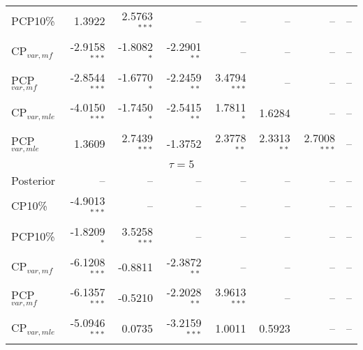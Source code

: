 {{\begin{table}
\begin{tabular}{l | rrrrrrr}
PCP10\% & 1.3922\phantom{$^{***}$} & 2.5763$^{***}$ &    --\phantom{$^{***}$} &    --\phantom{$^{***}$} &    --\phantom{$^{***}$} &    --\phantom{$^{***}$} &    --\phantom{$^{***}$}   \\ 
CP$_{var,mf}$ & -2.9158$^{***}$ & -1.8082$^{*}$\phantom{$^{**}$} & -2.2901$^{**}$\phantom{$^{*}$} &    --\phantom{$^{***}$} &    --\phantom{$^{***}$} &    --\phantom{$^{***}$} &    --\phantom{$^{***}$}   \\ 
PCP$_{var,mf}$ & -2.8544$^{***}$ & -1.6770$^{*}$\phantom{$^{**}$} & -2.2459$^{**}$\phantom{$^{*}$} & 3.4794$^{***}$ &    --\phantom{$^{***}$} &    --\phantom{$^{***}$} &    --\phantom{$^{***}$}   \\ 
CP$_{var,mle}$ & -4.0150$^{***}$ & -1.7450$^{*}$\phantom{$^{**}$} & -2.5415$^{**}$\phantom{$^{*}$} & 1.7811$^{*}$\phantom{$^{**}$} & 1.6284\phantom{$^{***}$} &    --\phantom{$^{***}$} &    --\phantom{$^{***}$}   \\ 
PCP$_{var,mle}$ & 1.3609\phantom{$^{***}$} & 2.7439$^{***}$ & -1.3752\phantom{$^{***}$} & 2.3778$^{**}$\phantom{$^{*}$} & 2.3313$^{**}$\phantom{$^{*}$} & 2.7008$^{***}$ &    --\phantom{$^{***}$}   \\ 
\hline 
%
%
\multicolumn{8}{c}{$\tau = 5$} \\ \hline 
Posterior &    --\phantom{$^{***}$} &    --\phantom{$^{***}$} &    --\phantom{$^{***}$} &    --\phantom{$^{***}$} &    --\phantom{$^{***}$} &    --\phantom{$^{***}$} &    --\phantom{$^{***}$}   \\ 
CP10\% & -4.9013$^{***}$ &    --\phantom{$^{***}$} &    --\phantom{$^{***}$} &    --\phantom{$^{***}$} &    --\phantom{$^{***}$} &    --\phantom{$^{***}$} &    --\phantom{$^{***}$}   \\ 
PCP10\% & -1.8209$^{*}$\phantom{$^{**}$} & 3.5258$^{***}$ &    --\phantom{$^{***}$} &    --\phantom{$^{***}$} &    --\phantom{$^{***}$} &    --\phantom{$^{***}$} &    --\phantom{$^{***}$}   \\ 
CP$_{var,mf}$ & -6.1208$^{***}$ & -0.8811\phantom{$^{***}$} & -2.3872$^{**}$\phantom{$^{*}$} &    --\phantom{$^{***}$} &    --\phantom{$^{***}$} &    --\phantom{$^{***}$} &    --\phantom{$^{***}$}   \\ 
PCP$_{var,mf}$ & -6.1357$^{***}$ & -0.5210\phantom{$^{***}$} & -2.2028$^{**}$\phantom{$^{*}$} & 3.9613$^{***}$ &    --\phantom{$^{***}$} &    --\phantom{$^{***}$} &    --\phantom{$^{***}$}   \\ 
CP$_{var,mle}$ & -5.0946$^{***}$ & 0.0735\phantom{$^{***}$} & -3.2159$^{***}$ & 1.0011\phantom{$^{***}$} & 0.5923\phantom{$^{***}$} &    --\phantom{$^{***}$} &    --\phantom{$^{***}$}   \\ 

\end{tabular}
\end{table}}}
